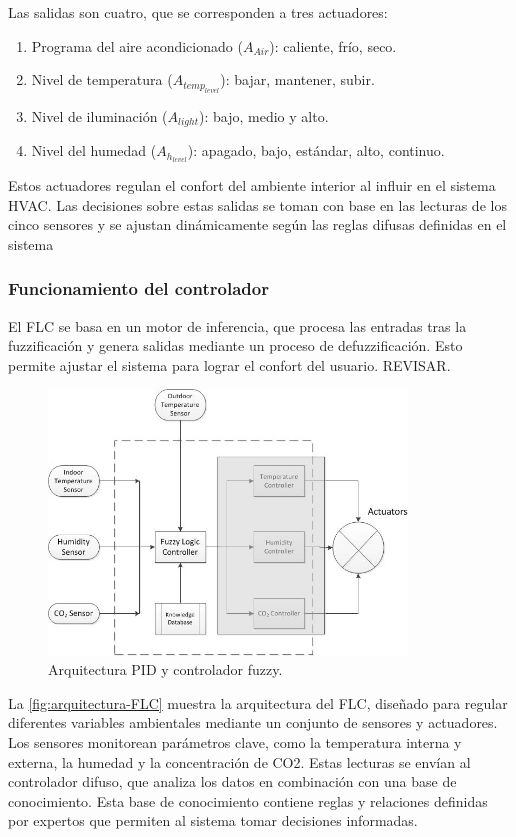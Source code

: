 Las salidas son cuatro, que se corresponden a tres actuadores:
\begin{enumerate}
	\item Programa del aire acondicionado ($A_{Air}$): caliente, frío, seco.
	\item Nivel de temperatura ($A_{temp_{level}}$): bajar, mantener, subir.
	\item Nivel de iluminación ($A_{light}$): bajo, medio y alto.
	\item Nivel del humedad ($A_{h_{level}}$): apagado, bajo, estándar, alto, continuo.
\end{enumerate}

Estos actuadores regulan el confort del ambiente interior al influir en el sistema HVAC. Las decisiones sobre estas salidas se toman con base en las lecturas de los cinco sensores y se ajustan dinámicamente según las reglas difusas definidas en el sistema

\subsubsection{Funcionamiento del controlador}

El FLC se basa en un motor de inferencia, que procesa las entradas tras la fuzzificación y genera salidas mediante un proceso de defuzzificación. Esto permite ajustar el sistema para lograr el confort del usuario. REVISAR.

\begin{figure}[H]
	\centering
	\includegraphics[width=0.85\textwidth]{imgs/arquitectura-FLC.JPG}
	\caption{Arquitectura PID y controlador fuzzy.}
	\label{fig:arquitectura-FLC}
\end{figure}

La \autoref{fig:arquitectura-FLC} muestra la arquitectura del FLC, diseñado para regular diferentes variables ambientales mediante un conjunto de sensores y actuadores. Los sensores monitorean parámetros clave, como la temperatura interna y externa, la humedad y la concentración de CO2. Estas lecturas se envían al controlador difuso, que analiza los datos en combinación con una base de conocimiento. Esta base de conocimiento contiene reglas y relaciones definidas por expertos que permiten al sistema tomar decisiones informadas.

